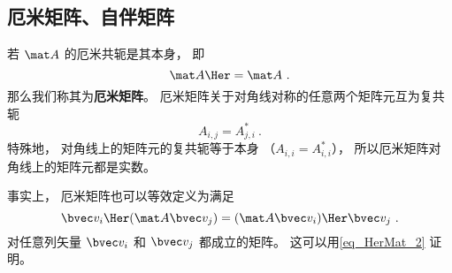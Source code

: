 \subsection{厄米矩阵、自伴矩阵}
若 $\mat A$ 的厄米共轭是其本身， 即
\begin{equation}
\mat A\Her = \mat A~.
\end{equation}
那么我们称其为\textbf{厄米矩阵}。 厄米矩阵关于对角线对称的任意两个矩阵元互为复共轭
\begin{equation}
A_{i,j} = A_{j,i}^*~.
\end{equation}
特殊地， 对角线上的矩阵元的复共轭等于本身 （$A_{i,i} = A_{i,i}^*$）， 所以厄米矩阵对角线上的矩阵元都是实数。

事实上， 厄米矩阵也可以等效定义为满足
\begin{equation}
\bvec v_i\Her (\mat A \bvec v_j) = (\mat A \bvec v_i)\Her \bvec v_j~.
\end{equation}
对任意列矢量 $\bvec v_i$ 和 $\bvec v_j$ 都成立的矩阵。 这可以用\autoref{eq_HerMat_2} 证明。
